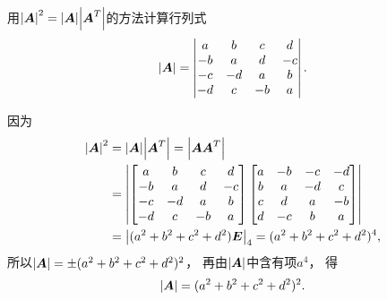 \begin{example}
用\(\abs{\boldsymbol{A}}^2 = \abs{\boldsymbol{A}} \abs{\boldsymbol{A}^T}\)的方法计算行列式\[
	\abs{\boldsymbol{A}} = \begin{vmatrix}
		a & b & c & d \\
		-b & a & d & -c \\
		-c & -d & a & b \\
		-d & c & -b & a
	\end{vmatrix}.
\]
\begin{solution}
因为\begin{align*}
	\abs{\boldsymbol{A}}^2 &= \abs{\boldsymbol{A}} \abs{\boldsymbol{A}^T} = \abs{\boldsymbol{A} \boldsymbol{A}^T} \\
	&= \abs{\begin{bmatrix}
		a & b & c & d \\
		-b & a & d & -c \\
		-c & -d & a & b \\
		-d & c & -b & a
	\end{bmatrix}
	\begin{bmatrix}
		a & -b & -c & -d \\
		b & a & -d & c \\
		c & d & a & -b \\
		d & -c & b & a
	\end{bmatrix}} \\
	&= \abs{(a^2+b^2+c^2+d^2) \boldsymbol{E}}_4
	= (a^2+b^2+c^2+d^2)^4,
\end{align*}
所以\(\abs{\boldsymbol{A}} = \pm(a^2+b^2+c^2+d^2)^2\)，
再由\(\abs{\boldsymbol{A}}\)中含有项\(a^4\)，
得\[
	\abs{\boldsymbol{A}} = (a^2+b^2+c^2+d^2)^2.
\]
\end{solution}
\end{example}

